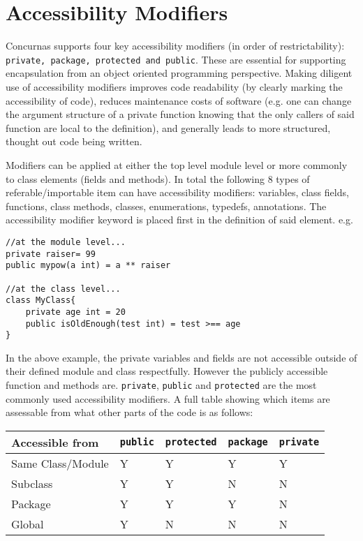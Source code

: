 \documentclass[conc-doc]{subfiles}
\begin{document}
	
	\chapter[Accessibility Modifiers]{Accessibility Modifiers}

Concurnas supports four key accessibility modifiers (in order of restrictability): \lstinline{private, package, protected and public}. These are essential for supporting encapsulation from an object oriented programming perspective. Making diligent use of accessibility modifiers improves code readability (by clearly marking the accessibility of code), reduces maintenance costs of software (e.g. one can change the argument structure of a private function knowing that the only callers of said function are local to the definition), and generally leads to more structured, thought out code being written.

Modifiers can be applied at either the top level module level or more commonly to class elements (fields and methods). In total the following 8 types of referable/importable item can have accessibility modifiers: variables, class fields, functions, class methods, classes, enumerations, typedefs, annotations. The accessibility modifier keyword is placed first in the definition of said element. e.g.
\begin{lstlisting}
//at the module level...
private raiser= 99
public mypow(a int) = a ** raiser

//at the class level...
class MyClass{
	private age int = 20
	public isOldEnough(test int) = test >== age
}
\end{lstlisting}

In the above example, the private variables and fields are not accessible outside of their defined module and class respectfully. However the publicly accessible function and methods are. \lstinline{private}, \lstinline{public} and \lstinline{protected} are the most commonly used accessibility modifiers. A full table showing which items are assessable from what other parts of the code is as follows:


\begin{table}[H]
	\centering
	\begin{tabular}{lllll}
		\hline
		Accessible from&\lstinline!public!&\lstinline!protected!&\lstinline!package!&\lstinline!private!\\
		\hline
		Same Class/Module&Y&Y&Y&Y\\
		Subclass&Y&Y&N&N\\
		Package&Y&Y&Y&N\\
		Global&Y&N&N&N\\
		\hline
	\end{tabular}%
\end{table}
\end{document}
